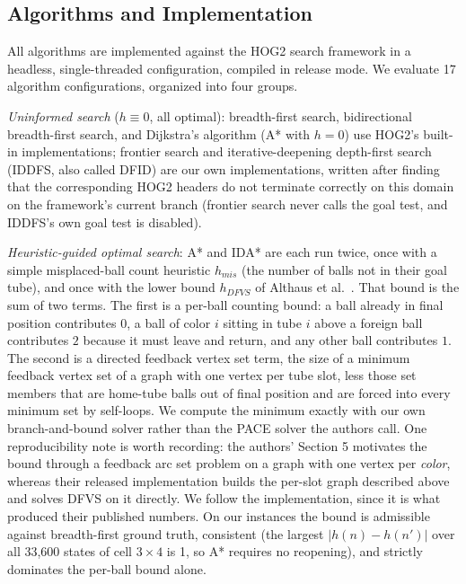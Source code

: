 \documentclass[letterpaper]{article}
\begin{document}
\subsection{Algorithms and Implementation}

All algorithms are implemented against the HOG2 search framework
\cite{sturtevant2012} in a headless, single-threaded configuration, compiled
in release mode. We evaluate 17 algorithm configurations, organized into
four groups.

\emph{Uninformed search} ($h \equiv 0$, all optimal): breadth-first search,
bidirectional breadth-first search, and Dijkstra's algorithm (A* with
$h=0$) use HOG2's built-in implementations; frontier search and
iterative-deepening depth-first search (IDDFS, also called DFID) are our
own implementations, written after finding that the corresponding HOG2
headers do not terminate correctly on this domain on the framework's
current branch (frontier search never calls the goal test, and IDDFS's own
goal test is disabled).

\emph{Heuristic-guided optimal search}: A* and IDA* are each run twice,
once with a simple misplaced-ball count heuristic $h_{mis}$ (the number of
balls not in their goal tube), and once with the lower bound
$h_{DFVS}$ of Althaus et al.\ \cite{althaus2025}. That bound is the sum of
two terms. The first is a per-ball counting bound: a ball already in final
position contributes $0$, a ball of color $i$ sitting in tube $i$ above a
foreign ball contributes $2$ because it must leave and return, and any
other ball contributes $1$. The second is a directed feedback vertex set
term, the size of a minimum feedback vertex set of a graph with one vertex
per tube slot, less those set members that are home-tube balls out of final
position and are forced into every minimum set by self-loops. We compute
the minimum exactly with our own branch-and-bound solver rather than the
PACE solver the authors call. One reproducibility note is worth recording:
the authors' Section 5 motivates the bound through a feedback arc set
problem on a graph with one vertex per \emph{color}, whereas their released
implementation builds the per-slot graph described above and solves DFVS on
it directly. We follow the implementation, since it is what produced their
published numbers. On our instances the bound is admissible against
breadth-first ground truth, consistent (the largest $|h(n)-h(n')|$ over all
33,600 states of cell $3 \times 4$ is 1, so A* requires no reopening), and
strictly dominates the per-ball bound alone.
\end{document}
